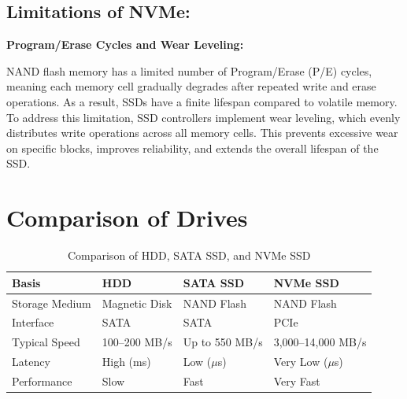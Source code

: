 \subsection*{Limitations of NVMe:}
\textbf{Program/Erase Cycles and Wear Leveling:}


NAND flash memory has a limited number of Program/Erase (P/E) cycles, meaning each memory cell gradually degrades after repeated write and erase operations. As a result, SSDs have a finite lifespan compared to volatile memory. To address this limitation, SSD controllers implement wear leveling, which evenly distributes write operations across all memory cells. This prevents excessive wear on specific blocks, improves reliability, and extends the overall lifespan of the SSD.
\cite{lexar_nvme}
\section{Comparison of Drives}
\begin{table}[h]
\centering
\renewcommand{\arraystretch}{1.4}
\begin{tabular}{|l|l|l|l|}
\hline
\textbf{Basis} & \textbf{HDD} & \textbf{SATA SSD} & \textbf{NVMe SSD} \\
\hline
Storage Medium & Magnetic Disk & NAND Flash & NAND Flash \\
\hline
Interface & SATA & SATA & PCIe \\
\hline
Typical Speed & 100--200 MB/s & Up to 550 MB/s & 3,000--14,000 MB/s \\
\hline
Latency & High (ms) & Low ($\mu$s) & Very Low ($\mu$s) \\
\hline
Performance & Slow & Fast & Very Fast \\
\hline
\end{tabular}
\caption{Comparison of HDD, SATA SSD, and NVMe SSD}
\label{tab:hdd_ssd_nvme}
\end{table}